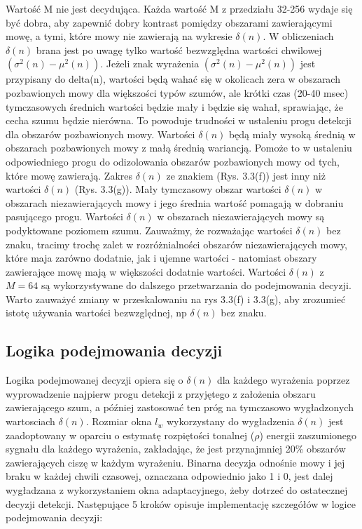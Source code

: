 \documentclass[eng,printmode]{mgr}
\begin{document}
    Wartość M nie jest decydująca. Każda wartość M z przedziału 32-256 wydaje się być dobra, aby zapewnić dobry kontrast pomiędzy obszarami zawierającymi mowę, a tymi, które mowy nie zawierają na wykresie $\delta(n)$. W obliczeniach $\delta(n)$ brana jest po uwagę tylko wartość bezwzględna wartości chwilowej $(\sigma^2(n) - \mu^2(n))$. Jeżeli znak wyrażenia $(\sigma^2(n) - \mu^2(n))$ jest przypisany do delta(n), wartości będą wahać się w okolicach zera w obszarach pozbawionych mowy dla większości typów szumów, ale krótki czas (20-40 msec) tymczasowych średnich wartości będzie mały i będzie się wahał, sprawiając, że cecha szumu będzie nierówna. To powoduje trudności w ustaleniu progu detekcji dla obszarów pozbawionych mowy. Wartości $\delta(n)$ będą miały wysoką średnią w obszarach pozbawionych mowy z małą średnią wariancją. Pomoże to w ustaleniu odpowiedniego progu do odizolowania obszarów pozbawionych mowy od tych, które mowę zawierają. Zakres $\delta(n)$ ze znakiem (Rys. 3.3(f)) jest inny niż wartości $\delta(n)$ (Rys. 3.3(g)). Mały tymczasowy obszar wartości $\delta(n)$ w obszarach niezawierających  mowy i jego średnia wartość pomagają w dobraniu pasującego progu. Wartości $\delta(n)$ w obszarach niezawierających mowy są podyktowane poziomem szumu. Zauważmy, że rozważając wartości  $\delta(n)$ bez znaku, tracimy trochę zalet w rozróżnialności obszarów niezawierających mowy, które maja zarówno dodatnie, jak i ujemne wartości - natomiast obszary zawierające mowę mają w większości dodatnie wartości. Wartości $\delta(n)$ z $M=64$ są wykorzystywane do dalszego przetwarzania do podejmowania decyzji. Warto zauważyć zmiany w przeskalowaniu na rys 3.3(f) i 3.3(g), aby zrozumieć istotę używania wartości bezwzględnej, np $\delta(n)$ bez znaku.
    
  \subsection{Logika podejmowania decyzji}
  Logika podejmowanej decyzji opiera się o $\delta(n)$ dla każdego wyrażenia poprzez wyprowadzenie najpierw progu detekcji z przyjętego z założenia obszaru zawierającego szum, a później zastosować ten próg na tymczasowo wygładzonych wartosciach $\delta(n)$. Rozmiar okna $l_{w}$ wykorzystany do wygładzenia $\delta(n)$ jest zaadoptowany w oparciu o estymatę rozpiętości tonalnej ($\rho$) energii zaszumionego sygnału dla każdego wyrażenia, zakładając, że jest przynajmniej 20\% obszarów zawierających ciszę w każdym wyrażeniu. Binarna decyzja odnośnie mowy i jej braku w każdej chwili czasowej, oznaczana odpowiednio jako 1 i 0, jest dalej wygładzana z wykorzystaniem okna adaptacyjnego, żeby dotrzeć do ostatecznej decyzji detekcji. Następujące 5 kroków opisuje implementację szczegółów w logice podejmowania decyzji:\vspace{5mm}
  
\end{document}
